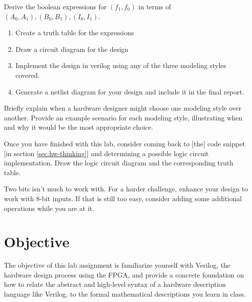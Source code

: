 \documentclass[12pt]{labmanual}
\begin{document}
\begin{questionssection}
\begin{question}
    Derive the boolean expressions for $(f_1, f_0)$ in terms of $(A_0, A_1), (B_0, B_1), (I_0, I_1)$.
    \begin{enumerate}
        \item Create a truth table for the expressions
        \item Draw a circuit diagram for the design
        \item Implement the design in verilog using any of the three modeling styles covered.
        \item Generate a netlist diagram for your design and include it in the final report.
    \end{enumerate}
\end{question}

\begin{question}
    Briefly explain when a hardware designer might choose one modeling style over another. Provide an example scenario for each modeling style, illustrating when and why it would be the most appropriate choice.
\end{question}

\begin{bonusquestion}
Once you have finished with this lab, consider coming back to [the] code snippet [in section \autoref{sec:hw-thinking}] and determining a possible logic circuit implementation. Draw the logic circuit diagram and the corresponding truth table.
\end{bonusquestion}

\begin{bonusquestion}
    Two bits isn't much to work with. For a harder challenge, enhance your design to work with 8-bit inputs. If that is still too easy, consider adding some additional operations while you are at it.
\end{bonusquestion}
\end{questionssection}
\clearpage

\section{Objective}
The objective of this lab assignment is familiarize yourself with Verilog, the hardware design process using the FPGA, and provide a concrete foundation on how to relate the abstract and high-level syntax of a hardware description language like Verilog, to the formal mathematical descriptions you learn in class.
\end{document}

